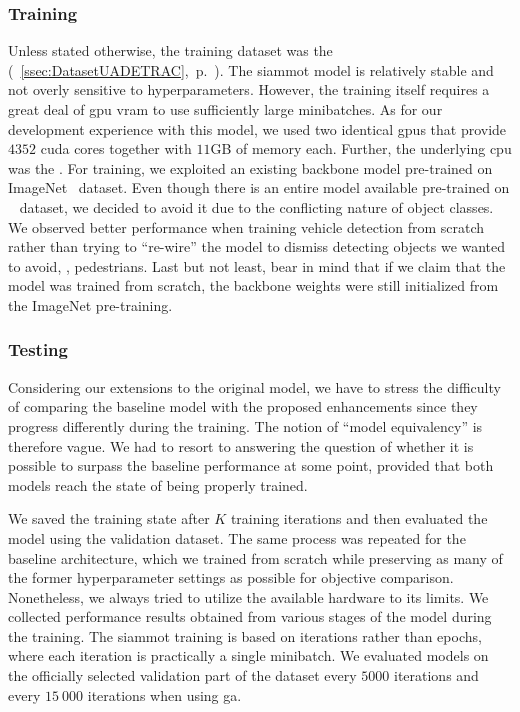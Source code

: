 \subsubsection{Training}

Unless stated otherwise, the training dataset was the \uadetrac{} (\sectiontext{}~\ref{ssec:DatasetUADETRAC},~p.~\pageref{ssec:DatasetUADETRAC}). The \gls{siammot} model is relatively stable and not overly sensitive to hyperparameters. However, the training itself requires a great deal of \gls{gpu} \gls{vram} to use sufficiently large minibatches. As for our development experience with this model, we used two identical \usedgpu{} \glspl{gpu} that provide $4352$ \gls{cuda} cores together with $11$GB of memory each. Further, the underlying \gls{cpu} was the \usedcpu{}. For training, we exploited an existing backbone model pre-trained on ImageNet~\cite{deng2009imagenet} dataset. Even though there is an entire model available pre-trained on \mscoco{}~\cite{lin2014mscoco} dataset, we decided to avoid it due to the conflicting nature of object classes. We observed better performance when training vehicle detection from scratch rather than trying to ``re-wire'' the model to dismiss detecting objects we wanted to avoid, \egtext{}, pedestrians. Last but not least, bear in mind that if we claim that the model was trained from scratch, the backbone weights were still initialized from the ImageNet pre-training.

\subsubsection{Testing}

Considering our extensions to the original model, we have to stress the difficulty of comparing the baseline model with the proposed enhancements since they progress differently during the training. The notion of ``model equivalency'' is therefore vague. We had to resort to answering the question of whether it is possible to surpass the baseline performance at some point, provided that both models reach the state of being properly trained.

We saved the training state after $K$ training iterations and then evaluated the model using the \uadetrac{} validation dataset. The same process was repeated for the baseline architecture, which we trained from scratch while preserving as many of the former hyperparameter settings as possible for objective comparison. Nonetheless, we always tried to utilize the available hardware to its limits. We collected performance results obtained from various stages of the model during the training. The \gls{siammot} training is based on iterations rather than epochs, where each iteration is practically a single minibatch. We evaluated models on the officially selected validation part of the dataset every $5000$ iterations and every $15\ 000$ iterations when using \gls{ga}.
